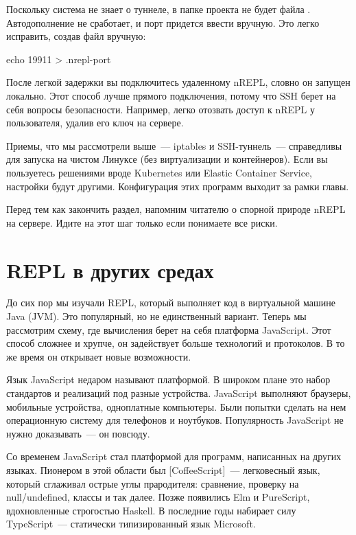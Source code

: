 Поскольку система не знает о туннеле, в папке проекта не будет файла . Автодополнение не сработает, и порт придется ввести вручную. Это легко исправить, создав файл вручную:

\begin{english}
  \begin{bash}
echo 19911 > .nrepl-port
  \end{bash}
\end{english}

После легкой задержки вы подключитесь удаленному nREPL, словно он запущен локально. Этот способ лучше прямого подключения, потому что SSH берет на себя вопросы безопасности. Например, легко отозвать доступ к nREPL у пользователя, удалив его ключ на сервере.

Приемы, что мы рассмотрели выше~--- iptables и SSH-туннель~--- справедливы для запуска на чистом Линуксе (без виртуализации и контейнеров). Если вы пользуетесь решениями вроде Kubernetes или Elastic Container Service, настройки будут другими. Конфигурация этих программ выходит за рамки главы.

Перед тем как закончить раздел, напомним читателю о спорной природе nREPL на сервере. Идите на этот шаг только если понимаете все риски.

\section{REPL в других средах}

До сих пор мы изучали REPL, который выполняет код в виртуальной машине Java (JVM). Это популярный, но не единственный вариант. Теперь мы рассмотрим схему, где вычисления берет на себя платформа JavaScript. Этот способ сложнее и хрупче, он задействует больше технологий и протоколов. В то же время он открывает новые возможности.

Язык JavaScript недаром называют платформой. В широком плане это набор стандартов и реализаций под разные устройства. JavaScript выполняют браузеры, мобильные устройства, одноплатные компьютеры. Были попытки сделать на нем операционную систему для телефонов и ноутбуков. Популярность JavaScript не нужно доказывать~--- он повсюду.

\def\urlcoffeescript{https://coffeescript.org/}

Со временем JavaScript стал платформой для программ, написанных на других языках. Пионером в этой области был \footurl{CoffeeScript}{\urlcoffeescript}[CoffeeScript]~--- легковесный язык, который сглаживал острые углы прародителя: сравнение, проверку на null/undefined, классы и так далее. Позже появились Elm и PureScript, вдохновленные строгостью Haskell. В последние годы набирает силу TypeScript~--- статически типизированный язык Microsoft.

